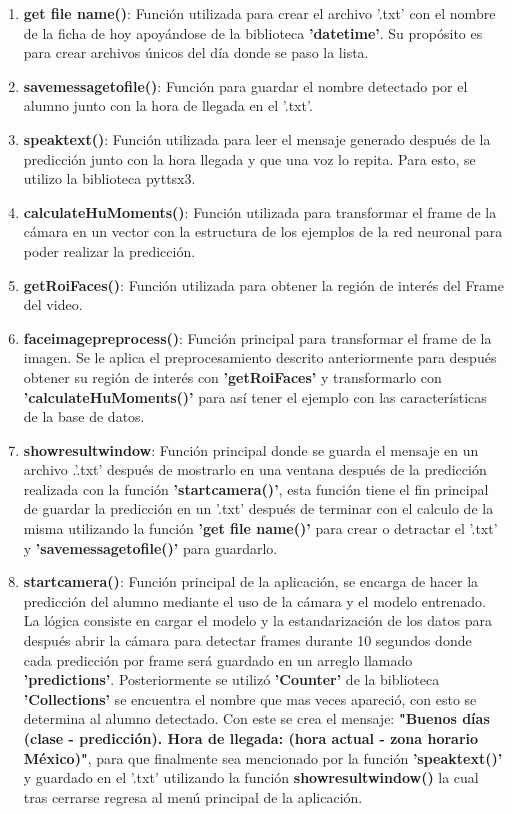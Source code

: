 \documentclass[12pt, letterpaper]{article}
\begin{document}
\begin{enumerate}
    \item \textbf{get file name()}: Función utilizada para crear el archivo '.txt' con el nombre de la ficha de hoy apoyándose de la biblioteca \textbf{'datetime'}. Su propósito es para crear archivos únicos del día donde se paso la lista.
    \item \textbf{savemessagetofile()}: Función para guardar el nombre detectado por el alumno junto con la hora de llegada en el '.txt'.
    \item \textbf{speaktext()}: Función utilizada para leer el mensaje generado después de la predicción junto con la hora llegada y que una voz lo repita. Para esto, se utilizo la biblioteca pyttsx3.
    \item \textbf{calculateHuMoments()}: Función utilizada para transformar el frame de la cámara en un vector con la estructura de los ejemplos de la red neuronal para poder realizar la predicción. 
    \item \textbf{getRoiFaces()}: Función utilizada para obtener la región de interés del Frame del video.
    \item \textbf{faceimagepreprocess()}: Función principal para transformar el frame de la imagen. Se le aplica el preprocesamiento descrito anteriormente para después obtener su región de interés con \textbf{'getRoiFaces'} y transformarlo con \textbf{'calculateHuMoments()'} para así tener el ejemplo con las características de la base de datos.
    \item \textbf{showresultwindow}: Función principal donde se guarda el mensaje en un archivo .'.txt' después de mostrarlo en una ventana después de la predicción realizada con la función \textbf{'startcamera()'}, esta función tiene el fin principal de guardar la predicción en un '.txt' después de terminar con el calculo de la misma utilizando la función \textbf{'get file name()'} para crear o detractar el '.txt' y \textbf{'savemessagetofile()'} para guardarlo.
    \item \textbf{startcamera()}: Función principal de la aplicación, se encarga de hacer la predicción del alumno mediante el uso de la cámara y el modelo entrenado. La lógica consiste en cargar el modelo y la estandarización de los datos para después abrir la cámara para detectar frames durante 10 segundos donde cada predicción por frame será guardado en un arreglo llamado \textbf{'predictions'}. Posteriormente se utilizó \textbf{'Counter'} de la biblioteca \textbf{'Collections'} se encuentra el nombre que mas veces apareció, con esto se determina al alumno detectado. Con este se crea el mensaje: \textbf{"Buenos días (clase - predicción). Hora de llegada: (hora actual - zona horario México)"}, para que finalmente sea mencionado por la función \textbf{'speaktext()'} y guardado en el '.txt' utilizando la función \textbf{showresultwindow()} la cual tras cerrarse regresa al menú principal de la aplicación.
\end{enumerate}
\end{document}
